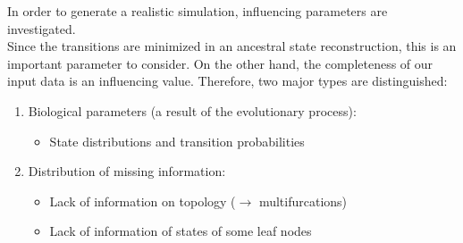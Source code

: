   In order to generate a realistic simulation, influencing parameters are investigated. \\
  Since the transitions are minimized in an ancestral state reconstruction, this is an important 
    parameter to consider. On the other hand, the completeness of our input data is an influencing 
    value. Therefore, two major types are distinguished:
  \begin{enumerate}
    \item Biological parameters (a result of the evolutionary process):
      \begin{itemize}
        \item State distributions and transition probabilities
      \end{itemize}
    \item Distribution of missing information:
      \begin{itemize}
        \item Lack of information on topology ($\rightarrow$ multifurcations)
        \item Lack of information of states of some leaf nodes
      \end{itemize}
  \end{enumerate}


